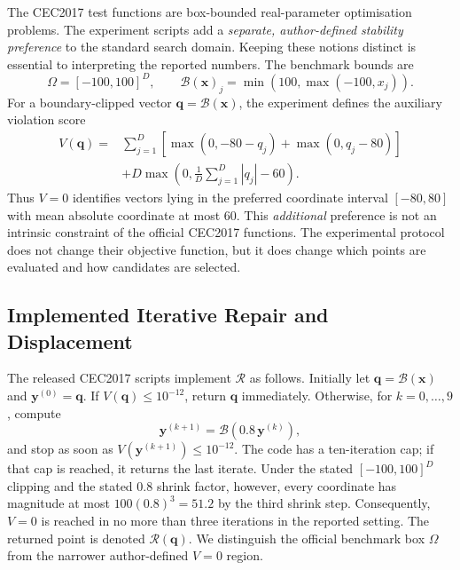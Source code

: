 \documentclass[a4paper,fleqn]{cas-sc}
\begin{document}
The CEC2017 test functions are box-bounded real-parameter optimisation problems. The experiment scripts add a \emph{separate, author-defined stability preference} to the standard search domain. Keeping these notions distinct is essential to interpreting the reported numbers. The benchmark bounds are
\begin{equation}
\Omega=[-100,100]^D, \qquad
\mathcal{B}(\mathbf{x})_j=\min(100,\max(-100,x_j)).
\label{eq:clip}
\end{equation}
For a boundary-clipped vector $\mathbf{q}=\mathcal{B}(\mathbf{x})$, the experiment defines the auxiliary violation score
\begin{equation}
\begin{split}
V(\mathbf{q})={}&\sum_{j=1}^{D}
\left[\max(0,-80-q_j)+\max(0,q_j-80)\right]\\
&+D\max\left(0,\frac{1}{D}\sum_{j=1}^{D}|q_j|-60\right).
\end{split}
\label{eq:violation}
\end{equation}
Thus $V=0$ identifies vectors lying in the preferred coordinate interval $[-80,80]$ with mean absolute coordinate at most 60. This \emph{additional} preference is not an intrinsic constraint of the official CEC2017 functions. The experimental protocol does not change their objective function, but it does change which points are evaluated and how candidates are selected.

\subsection{Implemented Iterative Repair and Displacement}

The released CEC2017 scripts implement $\mathcal{R}$ as follows. Initially let $\mathbf{q}=\mathcal{B}(\mathbf{x})$ and $\mathbf{y}^{(0)}=\mathbf{q}$. If $V(\mathbf{q})\leq10^{-12}$, return $\mathbf{q}$ immediately. Otherwise, for $k=0,\ldots,9$, compute
\begin{equation}
\mathbf{y}^{(k+1)}=\mathcal{B}\!\left(0.8\,\mathbf{y}^{(k)}\right),
\label{eq:shrink}
\end{equation}
and stop as soon as $V(\mathbf{y}^{(k+1)})\leq 10^{-12}$. The code has a ten-iteration cap; if that cap is reached, it returns the last iterate. Under the stated $[-100,100]^D$ clipping and the stated $0.8$ shrink factor, however, every coordinate has magnitude at most $100(0.8)^3=51.2$ by the third shrink step. Consequently, $V=0$ is reached in no more than three iterations in the reported setting. The returned point is denoted $\mathcal{R}(\mathbf{q})$. We distinguish the official benchmark box $\Omega$ from the narrower author-defined $V=0$ region.
\end{document}
